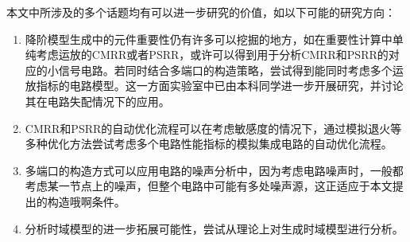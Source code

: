 本文中所涉及的多个话题均有可以进一步研究的价值，如以下可能的研究方向：

\begin{enumerate}[label=\emph{\alph*})]
	\item 降阶模型生成中的元件重要性仍有许多可以挖掘的地方，如在重要性计算中单纯考虑运放的CMRR或者PSRR，或许可以得到用于分析CMRR和PSRR的对应的小信号电路。若同时结合多端口的构造策略，尝试得到能同时考虑多个运放指标的电路模型。这一方面实验室中已由本科同学进一步开展研究，并讨论其在电路失配情况下的应用。
	\item CMRR和PSRR的自动优化流程可以在考虑敏感度的情况下，通过模拟退火等多种优化方法尝试考虑多个电路性能指标的模拟集成电路的自动优化流程。
	\item 多端口的构造方式可以应用电路的噪声分析中，因为考虑电路噪声时，一般都考虑某一节点上的噪声，但整个电路中可能有多处噪声源，这正适应于本文提出的构造哦啊条件。
	\item 分析时域模型的进一步拓展可能性，尝试从理论上对生成时域模型进行分析。
\end{enumerate}
